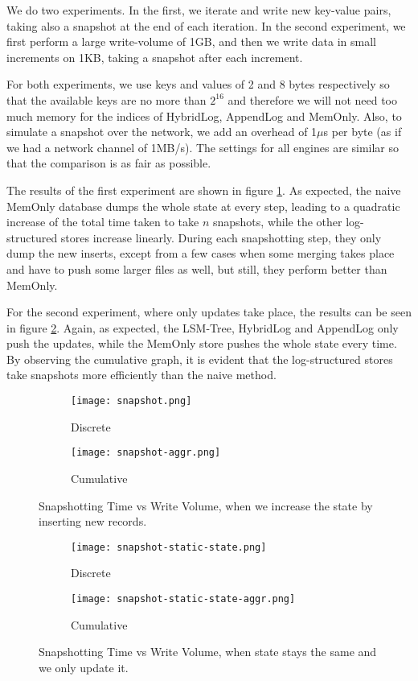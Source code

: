 We do two experiments. In the first, we iterate and write new key-value pairs, taking also a snapshot at the end of each iteration. In the second experiment, we first perform a large write-volume of 1GB, and then we write data in small increments on 1KB, taking a snapshot after each increment.

For both experiments, we use keys and values of 2 and 8 bytes respectively so that the available keys are no more than $2^{16}$ and therefore we will not need too much memory for the indices of HybridLog, AppendLog and MemOnly. Also, to simulate a snapshot over the network, we add an overhead of 1$\mu$s per byte (as if we had a network channel of 1MB/s). The settings for all engines are similar so that the comparison is as fair as possible.

The results of the first experiment are shown in figure \ref{fig:snapshot}. As expected, the naive MemOnly database dumps the whole state at every step, leading to a quadratic increase of the total time taken to take $n$ snapshots, while the other log-structured stores increase linearly. During each snapshotting step, they only dump the new inserts, except from a few cases when some merging takes place and have to push some larger files as well, but still, they perform better than MemOnly.

For the second experiment, where only updates take place, the results can be seen in figure \ref{fig:snapshot-static-state}. Again, as expected, the LSM-Tree, HybridLog and AppendLog only push the updates, while the MemOnly store pushes the whole state every time. By observing the cumulative graph, it is evident that the log-structured stores take snapshots more efficiently than the naive method.

\begin{figure}[h]
    \begin{subfigure}{.5\textwidth}
        \centering
        \texttt{[image: snapshot.png]}
        \caption{Discrete}
    \end{subfigure}
    \begin{subfigure}{.5\textwidth}
        \centering
        \texttt{[image: snapshot-aggr.png]}
        \caption{Cumulative}
    \end{subfigure}
    \caption{Snapshotting Time vs Write Volume, when we increase the state by inserting new records.}
    \label{fig:snapshot}
\end{figure}

\begin{figure}[h]
    \begin{subfigure}{.5\textwidth}
        \centering
        \texttt{[image: snapshot-static-state.png]}
        \caption{Discrete}
    \end{subfigure}
    \begin{subfigure}{.5\textwidth}
        \centering
        \texttt{[image: snapshot-static-state-aggr.png]}
        \caption{Cumulative}
    \end{subfigure}
    \caption{Snapshotting Time vs Write Volume, when state stays the same and we only update it.}
    \label{fig:snapshot-static-state}
\end{figure}

